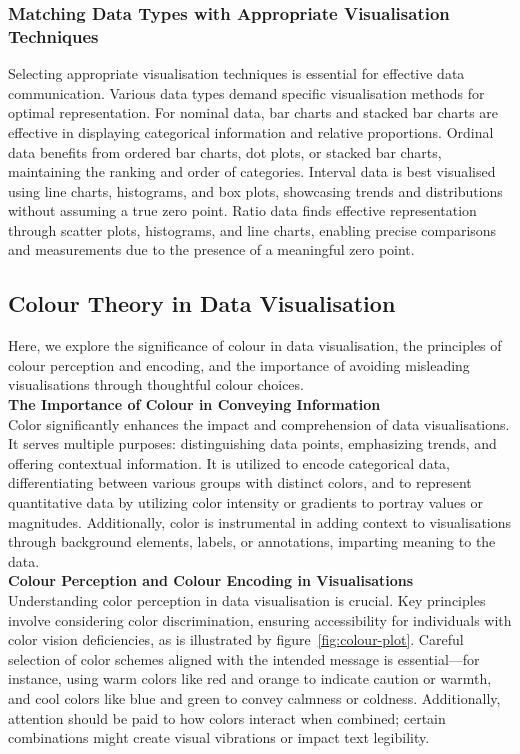 \documentclass{article}\usepackage[]{graphicx}\usepackage[]{xcolor}
\begin{document}
\subsubsection{Matching Data Types with Appropriate Visualisation Techniques}
Selecting appropriate visualisation techniques is essential for effective data communication. Various data types demand specific visualisation methods for optimal representation. For nominal data, bar charts and stacked bar charts are effective in displaying categorical information and relative proportions. Ordinal data benefits from ordered bar charts, dot plots, or stacked bar charts, maintaining the ranking and order of categories. Interval data is best visualised using line charts, histograms, and box plots, showcasing trends and distributions without assuming a true zero point. Ratio data finds effective representation through scatter plots, histograms, and line charts, enabling precise comparisons and measurements due to the presence of a meaningful zero point.

\subsection{Colour Theory in Data Visualisation}
Here, we explore the significance of colour in data visualisation, the principles of colour perception and encoding, and the importance of avoiding misleading visualisations through thoughtful colour choices.\\

\noindent \textbf{The Importance of Colour in Conveying Information}\\
Color significantly enhances the impact and comprehension of data visualisations. It serves multiple purposes: distinguishing data points, emphasizing trends, and offering contextual information. It is utilized to encode categorical data, differentiating between various groups with distinct colors, and to represent quantitative data by utilizing color intensity or gradients to portray values or magnitudes. Additionally, color is instrumental in adding context to visualisations through background elements, labels, or annotations, imparting meaning to the data.\\

\noindent \textbf{Colour Perception and Colour Encoding in Visualisations}\\
Understanding color perception in data visualisation is crucial. Key principles involve considering color discrimination, ensuring accessibility for individuals with color vision deficiencies, as is illustrated by figure~\ref{fig:colour-plot}. Careful selection of color schemes aligned with the intended message is essential—for instance, using warm colors like red and orange to indicate caution or warmth, and cool colors like blue and green to convey calmness or coldness. Additionally, attention should be paid to how colors interact when combined; certain combinations might create visual vibrations or impact text legibility.\\
\end{document}
